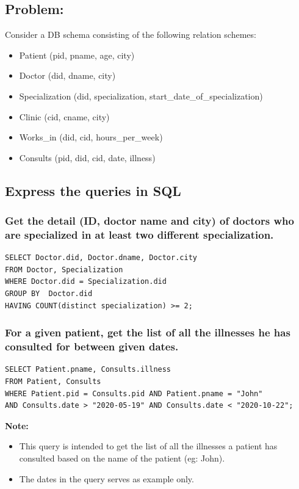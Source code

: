 \documentclass[a4paper]{article}
\begin{document}
\subsection{Problem:}
Consider a DB schema consisting of the following relation schemes:
\begin{itemize}
    \item Patient (pid, pname, age, city)
    \item Doctor (did, dname, city)
    \item Specialization (did, specialization, start\_date\_of\_specialization)
    \item Clinic (cid, cname, city)
    \item Works\_in (did, cid, hours\_per\_week)
    \item Consults (pid, did, cid, date, illness)
\end{itemize}

\subsection{Express the queries in SQL}

\subsubsection{Get the detail (ID, doctor name and city) of doctors who are specialized in at least two
different specialization.}

\begin{verbatim}
SELECT Doctor.did, Doctor.dname, Doctor.city
FROM Doctor, Specialization
WHERE Doctor.did = Specialization.did
GROUP BY  Doctor.did
HAVING COUNT(distinct specialization) >= 2;
\end{verbatim}

\subsubsection{For a given patient, get the list of all the illnesses he has consulted for between given
dates.}

\begin{verbatim}
SELECT Patient.pname, Consults.illness
FROM Patient, Consults
WHERE Patient.pid = Consults.pid AND Patient.pname = "John"
AND Consults.date > "2020-05-19" AND Consults.date < "2020-10-22";
\end{verbatim}
\textbf{Note:}
\begin{itemize}
    \item This query is intended to get the list of all the illnesses a patient has consulted based on the name of the patient (eg: John). 
    \item The dates in the query serves as example only.
\end{itemize}
\end{document}
